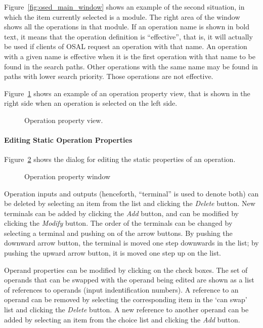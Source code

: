 \documentclass[twoside]{tceusermanual}
\begin{document}
Figure~\ref{fig:osed_main_window} shows an example of the second situation, in
which the item currently selected is a module. The right area of the window
shows all the operations in that module. If an operation name is shown in
bold text, it means that the operation definition is ``effective'', that is,
it will actually be used if clients of OSAL request an operation with that
name. An operation with a given name is effective when it is the first
operation with that name to be found in the search paths. Other operations
with the same name may be found in paths with lower search priority. Those
operations are not effective.

Figure~\ref{fig:osed_operation_property_view} shows an example of an operation 
property view, that is shown in the right side when an operation is selected 
on the left side.

\begin{figure}[tb]
\centerline{}
\caption{Operation property view.}
\label{fig:osed_operation_property_view}
\end{figure}

\paragraph{Editing Static Operation Properties}

Figure~\ref{fig:osed_operation_window} shows the dialog for editing the
static properties of an operation. 
 
\begin{figure}[tb]
\centerline{}
\caption{Operation property window}
\label{fig:osed_operation_window}
\end{figure}

Operation inputs and outputs (henceforth, ``terminal'' is used to denote both)
can be deleted by selecting an item from the list and clicking the \emph{Delete}
button. New terminals can be added
by clicking the \emph{Add} button, and can be modified by clicking the \emph{Modify}
button. The order of the terminals can be changed by selecting a terminal
and pushing on of the arrow buttons. By pushing the downward arrow button, the
terminal is moved one step downwards in the list; by pushing the upward arrow
button, it is moved one step up on the list.

Operand properties can be modified by clicking on the check boxes. The set
of operands that can be swapped with the operand being edited are shown as a
list of references to operands (input indentification numbers).  A reference
to an operand can be removed by selecting the corresponding item in the `can
swap' list and clicking the \emph{Delete} button.  A new reference to another
operand can be added by selecting an item from the choice list and clicking
the \emph{Add} button.
\end{document}
